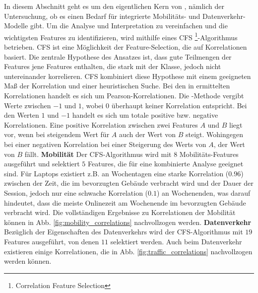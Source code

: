 \documentclass[12pt, a4paper]{article}
\begin{document}
In diesem Abschnitt geht es um den eigentlichen Kern von \cite{Alipour2018}, nämlich der Untersuchung, ob es einen Bedarf
für integrierte Mobilitäts- und Datenverkehr-Modelle gibt. Um die Analyse und Interpretation zu vereinfachen und die 
wichtigsten Features zu identifizieren, wird mithilfe eines \textsc{CFS} \footnote{Correlation Feature Selection}-Algorithmus
 betrieben. \textsc{CFS} ist eine Möglichkeit der Feature-Selection, die auf Korrelationen
basiert. Die zentrale Hypothese des Ansatzes ist, dass gute Teilmengen der Features jene Features enthalten, die stark
mit der Klasse, jedoch nicht untereinander korrelieren. \textsc{CFS} kombiniert diese Hypothese mit einem geeigneten
Maß der Korrelation und einer heuristischen Suche. \cite{Hall2000}
Bei den in \cite{Alipour2018} ermittelten Korrelationen handelt es sich um Pearson-Korrelationen.
Die -Methode vergibt Werte zwischen $-1$ und $1$, wobei $0$ überhaupt keiner Korrelation
entspricht. Bei den Werten $1$ und $-1$ handelt es sich um totale positive bzw. negative Korrelationen.
Eine positive Korrelation zwischen zwei Features $A$ und $B$ liegt vor, wenn bei steigendem Wert für $A$
auch der Wert von $B$ steigt. Wohingegen bei einer negativen Korrelation bei einer Steigerung des Werts von $A$, 
der Wert von $B$ fällt. \cite{Nettleton2014}
\newline\newline
\textbf{Mobilität}\newline
Der \textsc{CFS}-Algorithmus wird mit $8$ Mobilitäts-Features ausgeführt und selektiert $5$ Features, 
die für eine kombinierte Analyse geeignet sind. Für Laptops existiert z.B. an Wochentagen eine starke Korrelation ($0.96$)
zwischen der Zeit, die im bevorzugten Gebäude verbracht wird und der Dauer der Session, jedoch nur eine schwache Korrelation
($0.1$) an Wochenenden, was darauf hindeutet, dass die meiste Onlinezeit am Wochenende im bevorzugten
Gebäude verbracht wird. \cite{Alipour2018} Die vollständigen Ergebnisse zu Korrelationen der Mobilität können in
Abb. \ref{fig:mobility_correlations} nachvollzogen werden.
\newline\newline
\textbf{Datenverkehr}\newline
Bezüglich der Eigenschaften des Datenverkehrs wird der \textsc{CFS}-Algorithmus mit $19$ Features ausgeführt, von denen $11$
selektiert werden. Auch beim Datenverkehr existieren einige Korrelationen, die in Abb. \ref{fig:traffic_correlations} nachvollzogen werden können.
\end{document}
